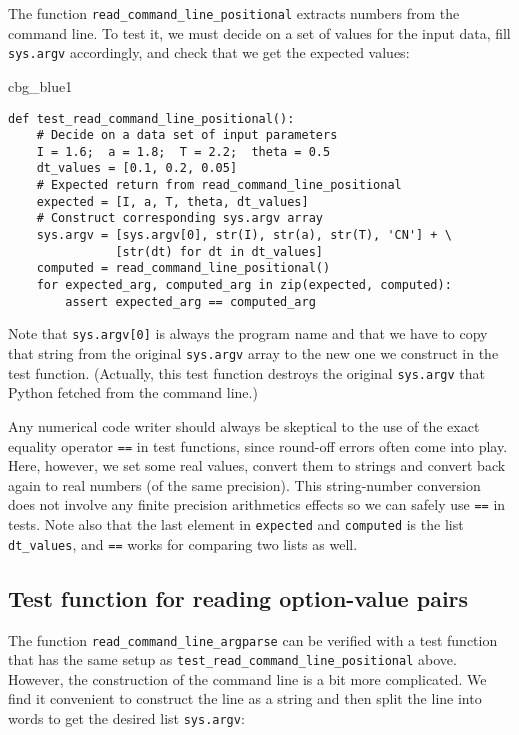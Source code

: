 \documentclass[graybox,sectrefs,envcountresetchap,open=right,final]{svmonodo}
\newenvironment{_cod_tight}[1]{
   \def\FrameCommand{\colorbox{#1}}
   \FrameRule0.6pt\MakeFramed {\FrameRestore}\vskip3mm}
   {\vskip0mm\endMakeFramed}
\newenvironment{cod}[1]{
\bgroup\rmfamily
\fboxsep=0mm\relax
\begin{_cod_tight}{#1}
\list{}{\parsep=-2mm\parskip=0mm\topsep=0pt\leftmargin=2mm
\rightmargin=2\leftmargin\leftmargin=4pt\relax}
\item\relax}
{\endlist\end{_cod_tight}\egroup}
\begin{document}
The function \Verb!read_command_line_positional! extracts numbers from the
command line. To test it, we must decide on a set of values for
the input data, fill \texttt{sys.argv}
accordingly, and check that we get the expected values:

\begin{cod}{cbg_blue1}\begin{Verbatim}[numbers=none,fontsize=\fontsize{9pt}{9pt},baselinestretch=0.95,xleftmargin=2mm]
def test_read_command_line_positional():
    # Decide on a data set of input parameters
    I = 1.6;  a = 1.8;  T = 2.2;  theta = 0.5
    dt_values = [0.1, 0.2, 0.05]
    # Expected return from read_command_line_positional
    expected = [I, a, T, theta, dt_values]
    # Construct corresponding sys.argv array
    sys.argv = [sys.argv[0], str(I), str(a), str(T), 'CN'] + \ 
               [str(dt) for dt in dt_values]
    computed = read_command_line_positional()
    for expected_arg, computed_arg in zip(expected, computed):
        assert expected_arg == computed_arg
\end{Verbatim}
\end{cod}
\noindent
Note that \texttt{sys.argv[0]} is always the program name and that we have to
copy that string from the original \texttt{sys.argv} array to the new one we
construct in the test function. (Actually, this test function destroys
the original \texttt{sys.argv} that Python fetched from the command line.)

Any numerical code writer should always be skeptical to the use of the exact
equality operator \texttt{==} in test functions, since round-off errors often
come into play. Here, however, we set some real values, convert them
to strings and convert back again to real numbers (of the same precision).
This string-number conversion does not involve any finite precision
arithmetics effects so we
can safely use \texttt{==} in tests. Note also that the last element in
\texttt{expected} and \texttt{computed} is the list \Verb!dt_values!, and \texttt{==} works
for comparing two lists as well.

\subsection{Test function for reading option-value pairs}

The function \Verb!read_command_line_argparse! can be verified with a
test function that has the same setup as \Verb!test_read_command_line_positional!
above.
However, the construction of the command line is a bit more complicated.
We find it convenient to construct the line as a string and then
split the line into words to get the desired list \texttt{sys.argv}:
\end{document}
